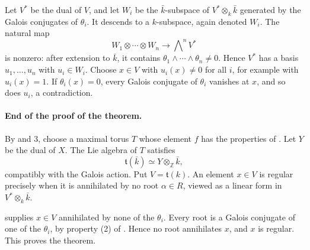 Let \(V^*\) be the dual of \(V\), and let \(W_i\) be the
\(\bar k\)-subspace of \(V^*\otimes_k\bar k\) generated by the
Galois conjugates of \(\theta_i\). It descends to a
\(k\)-subspace, again denoted \(W_i\). The natural map
\[
  W_1\otimes\cdots\otimes W_n
     \longrightarrow\bigwedge\nolimits^n V^*
\]
is nonzero: after extension to \(\bar k\), it contains
\(\theta_1\wedge\cdots\wedge\theta_n\ne0\). Hence \(V^*\) has a
basis \(u_1,\ldots,u_n\) with \(u_i\in W_i\). Choose
\(x\in V\) with \(u_i(x)\ne0\) for all \(i\), for example with
\(u_i(x)=1\). If \(\theta_i(x)=0\), every Galois conjugate of
\(\theta_i\) vanishes at \(x\), and so does \(u_i\), a
contradiction.

\paragraph{\textbf{End of the proof of the theorem.}}

By  and 3, choose a maximal torus \(T\) whose element
\(f\) has the properties of . Let \(Y\) be the dual of
\(X\). The Lie algebra of \(T\) satisfies
\[
  \mathfrak t(\bar k)\simeq Y\otimes_{\mathbb Z}\bar k,
\]
compatibly with the Galois action. Put
\(V=\mathfrak t(k)\). An element \(x\in V\) is regular precisely
when it is annihilated by no root \(\alpha\in R\), viewed as a
linear form in \(V^*\otimes_k\bar k\).

 supplies \(x\in V\) annihilated by none of the
\(\theta_i\). Every root is a Galois conjugate of one of the
\(\theta_i\), by property \textup{(2)} of . Hence no root
annihilates \(x\), and \(x\) is regular. This proves the theorem.
